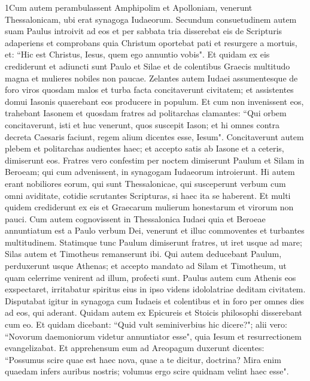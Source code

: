 \begin{biblechapter}   1Cum autem perambulassent Amphipolim et Apolloniam, venerunt Thessalonicam, ubi erat synagoga Iudaeorum. 
\verse Secundum consuetudinem autem suam Paulus introivit ad eos et per sabbata tria disserebat eis de Scripturis 
\verse adaperiens et comprobans quia Christum oportebat pati et resurgere a mortuis, et: “Hic est Christus, Iesus, quem ego annuntio vobis". 
\verse Et quidam ex eis crediderunt et adiuncti sunt Paulo et Silae et de colentibus Graecis multitudo magna et mulieres nobiles non paucae. 
\verse Zelantes autem Iudaei assumentesque de foro viros quosdam malos et turba facta concitaverunt civitatem; et assistentes domui Iasonis quaerebant eos producere in populum. 
\verse Et cum non invenissent eos, trahebant Iasonem et quosdam fratres ad politarchas clamantes: “Qui orbem concitaverunt, isti et huc venerunt, 
\verse quos suscepit Iason; et hi omnes contra decreta Caesaris faciunt, regem alium dicentes esse, Iesum".  
\verse Concitaverunt autem plebem et politarchas audientes haec; 
\verse et accepto satis ab Iasone et a ceteris, dimiserunt eos. 
\verse Fratres vero confestim per noctem dimiserunt Paulum et Silam in Beroeam; qui cum advenissent, in synagogam Iudaeorum introierunt. 
\verse Hi autem erant nobiliores eorum, qui sunt Thessalonicae, qui susceperunt verbum cum omni aviditate, cotidie scrutantes Scripturas, si haec ita se haberent. 
\verse Et multi quidem crediderunt ex eis et Graecarum mulierum honestarum et virorum non pauci. 
\verse Cum autem cognovissent in Thessalonica Iudaei quia et Beroeae annuntiatum est a Paulo verbum Dei, venerunt et illuc commoventes et turbantes multitudinem.  
\verse Statimque tunc Paulum dimiserunt fratres, ut iret usque ad mare; Silas autem et Timotheus remanserunt ibi. 
\verse Qui autem deducebant Paulum, perduxerunt usque Athenas; et accepto mandato ad Silam et Timotheum, ut quam celerrime venirent ad illum, profecti sunt. 
\verse Paulus autem cum Athenis eos exspectaret, irritabatur spiritus eius in ipso videns idololatriae deditam civitatem. 
\verse Disputabat igitur in synagoga cum Iudaeis et colentibus et in foro per omnes dies ad eos, qui aderant. 
\verse Quidam autem ex Epicureis et Stoicis philosophi disserebant cum eo. Et quidam dicebant: “Quid vult seminiverbius hic dicere?"; alii vero: “Novorum daemoniorum videtur annuntiator esse", quia Iesum et resurrectionem evangelizabat. 
\verse Et apprehensum eum ad Areopagum duxerunt dicentes: “Possumus scire quae est haec nova, quae a te dicitur, doctrina? 
\verse Mira enim quaedam infers auribus nostris; volumus ergo scire quidnam velint haec esse".  

\end{biblechapter}
